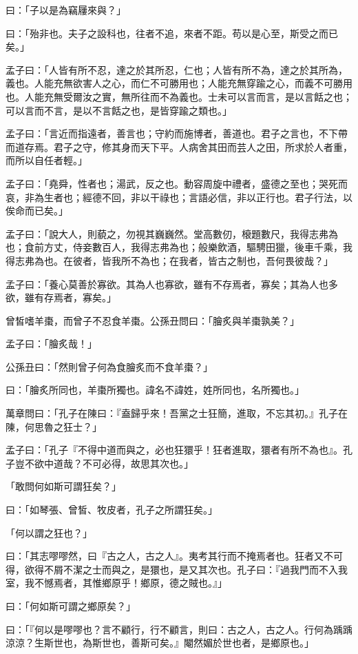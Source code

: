 \documentclass[12pt,a4paper]{ctexbook}
\begin{document}
曰：「子以是為竊屨來與？」\par
曰：「殆非也。夫子之設科也，往者不追，來者不距。苟以是心至，斯受之而已矣。」\par
孟子曰：「人皆有所不忍，達之於其所忍，仁也；人皆有所不為，達之於其所為，義也。人能充無欲害人之心，而仁不可勝用也；人能充無穿踰之心，而義不可勝用也。人能充無受爾汝之實，無所往而不為義也。士未可以言而言，是以言餂之也；可以言而不言，是以不言餂之也，是皆穿踰之類也。」\par
孟子曰：「言近而指遠者，善言也；守約而施博者，善道也。君子之言也，不下帶而道存焉。君子之守，修其身而天下平。人病舍其田而芸人之田，所求於人者重，而所以自任者輕。」\par
孟子曰：「堯舜，性者也；湯武，反之也。動容周旋中禮者，盛德之至也；哭死而哀，非為生者也；經德不回，非以干祿也；言語必信，非以正行也。君子行法，以俟命而已矣。」\par
孟子曰：「說大人，則藐之，勿視其巍巍然。堂高數仞，榱題數尺，我得志弗為也；食前方丈，侍妾數百人，我得志弗為也；般樂飲酒，驅騁田獵，後車千乘，我得志弗為也。在彼者，皆我所不為也；在我者，皆古之制也，吾何畏彼哉？」\par
孟子曰：「養心莫善於寡欲。其為人也寡欲，雖有不存焉者，寡矣；其為人也多欲，雖有存焉者，寡矣。」\par
曾皙嗜羊棗，而曾子不忍食羊棗。公孫丑問曰：「膾炙與羊棗孰美？」\par
孟子曰：「膾炙哉！」\par
公孫丑曰：「然則曾子何為食膾炙而不食羊棗？」\par
曰：「膾炙所同也，羊棗所獨也。諱名不諱姓，姓所同也，名所獨也。」\par
萬章問曰：「孔子在陳曰：『盍歸乎來！吾黨之士狂簡，進取，不忘其初。』孔子在陳，何思魯之狂士？」\par
孟子曰：「孔子『不得中道而與之，必也狂獧乎！狂者進取，獧者有所不為也』。孔子豈不欲中道哉？不可必得，故思其次也。」\par
「敢問何如斯可謂狂矣？」\par
曰：「如琴張、曾皙、牧皮者，孔子之所謂狂矣。」\par
「何以謂之狂也？」\par
曰：「其志嘐嘐然，曰『古之人，古之人』。夷考其行而不掩焉者也。狂者又不可得，欲得不屑不潔之士而與之，是獧也，是又其次也。孔子曰：『過我門而不入我室，我不憾焉者，其惟鄉原乎！鄉原，德之賊也。』」\par
曰：「何如斯可謂之鄉原矣？」\par
曰：「『何以是嘐嘐也？言不顧行，行不顧言，則曰：古之人，古之人。行何為踽踽涼涼？生斯世也，為斯世也，善斯可矣。』閹然媚於世也者，是鄉原也。」\par
\end{document}
